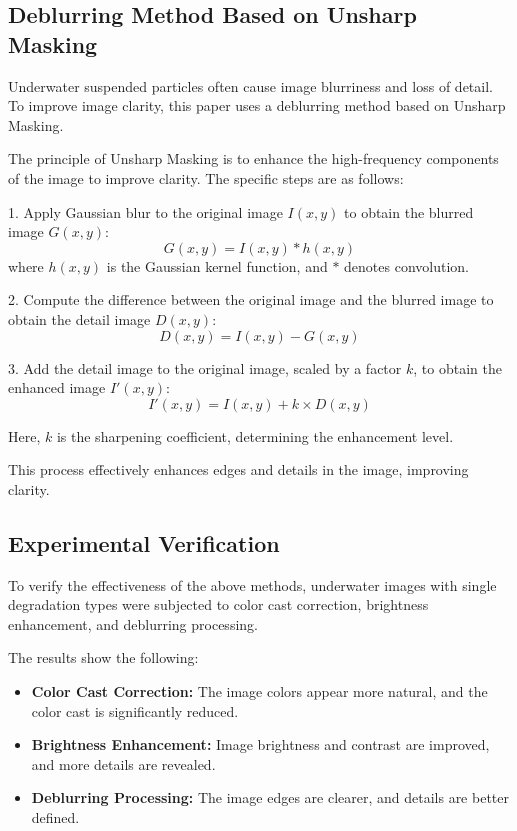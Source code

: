 \documentclass{apmcmthesis}
\begin{document}
\subsection{Deblurring Method Based on Unsharp Masking}
Underwater suspended particles often cause image blurriness and loss of detail. To improve image clarity, this paper uses a deblurring method based on Unsharp Masking.

The principle of Unsharp Masking is to enhance the high-frequency components of the image to improve clarity. The specific steps are as follows:

1. Apply Gaussian blur to the original image $I(x, y)$ to obtain the blurred image $G(x, y)$:
   \[
   G(x, y) = I(x, y) * h(x, y)
   \]
   where $h(x, y)$ is the Gaussian kernel function, and $*$ denotes convolution.

2. Compute the difference between the original image and the blurred image to obtain the detail image $D(x, y)$:
   \[
   D(x, y) = I(x, y) - G(x, y)
   \]

3. Add the detail image to the original image, scaled by a factor $k$, to obtain the enhanced image $I'(x, y)$:
   \[
   I'(x, y) = I(x, y) + k \times D(x, y)
   \]

   Here, $k$ is the sharpening coefficient, determining the enhancement level.

This process effectively enhances edges and details in the image, improving clarity.

\subsection{Experimental Verification}
To verify the effectiveness of the above methods, underwater images with single degradation types were subjected to color cast correction, brightness enhancement, and deblurring processing.

The results show the following:

\begin{itemize}
    \item \textbf{Color Cast Correction:} The image colors appear more natural, and the color cast is significantly reduced.
    \item \textbf{Brightness Enhancement:} Image brightness and contrast are improved, and more details are revealed.
    \item \textbf{Deblurring Processing:} The image edges are clearer, and details are better defined.
\end{itemize}
\end{document}
